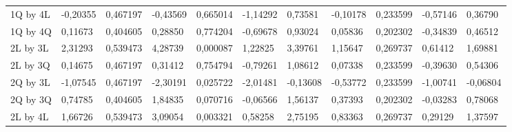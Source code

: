 \begin{table}[H]
{\begin{tabular}{lllllllllll}
\rowcolor[HTML]{FFFFFF} 
1Q by 4L       & {\color[HTML]{181A1B} -0,20355} & {\color[HTML]{181A1B} 0,467197} & {\color[HTML]{181A1B} -0,43569} & {\color[HTML]{181A1B} 0,665014} & {\color[HTML]{181A1B} -1,14292} & {\color[HTML]{181A1B} 0,73581}  & {\color[HTML]{181A1B} -0,10178} & {\color[HTML]{181A1B} 0,233599} & {\color[HTML]{181A1B} -0,57146} & {\color[HTML]{181A1B} 0,36790}  \\
\rowcolor[HTML]{FFFFFF} 
1Q by 4Q       & {\color[HTML]{181A1B} 0,11673}  & {\color[HTML]{181A1B} 0,404605} & {\color[HTML]{181A1B} 0,28850}  & {\color[HTML]{181A1B} 0,774204} & {\color[HTML]{181A1B} -0,69678} & {\color[HTML]{181A1B} 0,93024}  & {\color[HTML]{181A1B} 0,05836}  & {\color[HTML]{181A1B} 0,202302} & {\color[HTML]{181A1B} -0,34839} & {\color[HTML]{181A1B} 0,46512}  \\
\rowcolor[HTML]{FFFFFF} 
2L by 3L       & {\color[HTML]{FF0000} 2,31293}  & {\color[HTML]{FF0000} 0,539473} & {\color[HTML]{FF0000} 4,28739}  & {\color[HTML]{FF0000} 0,000087} & {\color[HTML]{FF0000} 1,22825}  & {\color[HTML]{FF0000} 3,39761}  & {\color[HTML]{FF0000} 1,15647}  & {\color[HTML]{FF0000} 0,269737} & {\color[HTML]{FF0000} 0,61412}  & {\color[HTML]{FF0000} 1,69881}  \\
\rowcolor[HTML]{FFFFFF} 
2L by 3Q       & {\color[HTML]{181A1B} 0,14675}  & {\color[HTML]{181A1B} 0,467197} & {\color[HTML]{181A1B} 0,31412}  & {\color[HTML]{181A1B} 0,754794} & {\color[HTML]{181A1B} -0,79261} & {\color[HTML]{181A1B} 1,08612}  & {\color[HTML]{181A1B} 0,07338}  & {\color[HTML]{181A1B} 0,233599} & {\color[HTML]{181A1B} -0,39630} & {\color[HTML]{181A1B} 0,54306}  \\
\rowcolor[HTML]{FFFFFF} 
2Q by 3L       & {\color[HTML]{FF0000} -1,07545} & {\color[HTML]{FF0000} 0,467197} & {\color[HTML]{FF0000} -2,30191} & {\color[HTML]{FF0000} 0,025722} & {\color[HTML]{FF0000} -2,01481} & {\color[HTML]{FF0000} -0,13608} & {\color[HTML]{FF0000} -0,53772} & {\color[HTML]{FF0000} 0,233599} & {\color[HTML]{FF0000} -1,00741} & {\color[HTML]{FF0000} -0,06804} \\
\rowcolor[HTML]{FFFFFF} 
2Q by 3Q       & {\color[HTML]{181A1B} 0,74785}  & {\color[HTML]{181A1B} 0,404605} & {\color[HTML]{181A1B} 1,84835}  & {\color[HTML]{181A1B} 0,070716} & {\color[HTML]{181A1B} -0,06566} & {\color[HTML]{181A1B} 1,56137}  & {\color[HTML]{181A1B} 0,37393}  & {\color[HTML]{181A1B} 0,202302} & {\color[HTML]{181A1B} -0,03283} & {\color[HTML]{181A1B} 0,78068}  \\
\rowcolor[HTML]{FFFFFF} 
2L by 4L       & {\color[HTML]{FF0000} 1,66726}  & {\color[HTML]{FF0000} 0,539473} & {\color[HTML]{FF0000} 3,09054}  & {\color[HTML]{FF0000} 0,003321} & {\color[HTML]{FF0000} 0,58258}  & {\color[HTML]{FF0000} 2,75195}  & {\color[HTML]{FF0000} 0,83363}  & {\color[HTML]{FF0000} 0,269737} & {\color[HTML]{FF0000} 0,29129}  & {\color[HTML]{FF0000} 1,37597}  \\

\end{tabular}}
\end{table}
